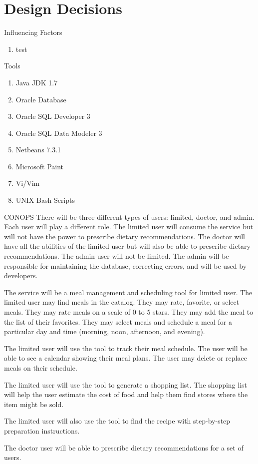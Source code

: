 \documentclass[a4paper,10pt,toc=graduated]{article}
\begin{document}
\section{Design Decisions}
\begin{mySubsection}{Influencing Factors}
\begin{enumerate}
\item test
\end{enumerate}
\end{mySubsection}
\begin{mySubsection}{Tools}
\begin{enumerate}
\item Java JDK 1.7
\item Oracle Database
\item Oracle SQL Developer 3
\item Oracle SQL Data Modeler 3
\item Netbeans 7.3.1
\item Microsoft Paint
\item Vi/Vim
\item UNIX Bash Scripts
\end{enumerate}
\end{mySubsection}
\begin{mySubsection}{CONOPS}
\noindent
There will be three different types of users: limited, doctor, and admin.
Each user will play a different role.
The limited user will consume the service but will not have the power to prescribe dietary recommendations.
The doctor will have all the abilities of the limited user but will also be able to prescribe dietary recommendations.
The admin user will not be limited.
The admin will be responsible for maintaining the database, correcting errors, and will be used by developers.
\newline

\noindent
The service will be a meal management and scheduling tool for limited user.
The limited user may find meals in the catalog.
They may rate, favorite, or select meals.
They may rate meals on a scale of 0 to 5 stars.
They may add the meal to the list of their favorites.
They may select meals and schedule a meal for a particular day and time (morning, noon, afternoon, and evening).
\newline

\noindent
The limited user will use the tool to track their meal schedule.
The user will be able to see a calendar showing their meal plans.
The user may delete or replace meals on their schedule.
\newline

\noindent
The limited user will use the tool to generate a shopping list.
The shopping list will help the user estimate the cost of food and help them find stores where the item might be sold.
\newline

\noindent
The limited user will also use the tool to find the recipe with step-by-step preparation instructions.
\newline

\noindent
The doctor user will be able to prescribe dietary recommendations for a set of users.
\end{mySubsection}
\end{document}
